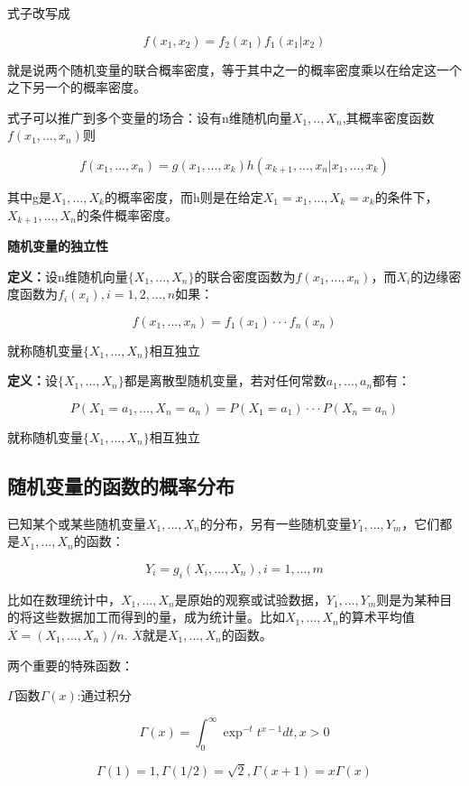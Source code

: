 \documentclass{ctexart}
\begin{document}
	式子改写成
	
	\[f(x_1, x_2)=f_2(x_1)f_1(x_1|x_2)\]
	
	就是说两个随机变量的联合概率密度，等于其中之一的概率密度乘以在给定这一个之下另一个的概率密度。
	
	式子可以推广到多个变量的场合：设有n维随机向量\(X_1,..,X_n\),其概率密度函数\(f(x_1,...,x_n)\)则
	
	\[f(x_1,...,x_n)=g(x_1,...,x_k)h(x_{k+1},...,x_n|x_1,...,x_k)\]
	
	其中g是\(X_1,...,X_k\)的概率密度，而h则是在给定\(X_1=x_1,...,X_k=x_k\)的条件下，\(X_{k+1},...,X_n\)的条件概率密度。
	
	\mbox{}
	
	\textbf{随机变量的独立性}
	
	\textbf{定义：}设n维随机向量\(\{X_1,...,X_n\}\)的联合密度函数为\(f(x_1,...,x_n)\)，而\(X_i\)的边缘密度函数为\(f_i(x_i),i=1,2,...,n\)如果：
	
	\[f(x_1,...,x_n)=f_1(x_1)···f_n(x_n)\]
	
	就称随机变量\(\{X_1,...,X_n\}\)相互独立
	
	\mbox{}
	
	\textbf{定义：}设\(\{X_1,...,X_n\}\)都是离散型随机变量，若对任何常数\(a_1,...,a_n\)都有：
	
	\[P(X_1=a_1,...,X_n=a_n)=P(X_1=a_1)···P(X_n=a_n)\]
	
	就称随机变量\(\{X_1,...,X_n\}\)相互独立
	
	\subsection{随机变量的函数的概率分布}
	
	已知某个或某些随机变量\(X_1,...,X_n\)的分布，另有一些随机变量\(Y_1,...,Y_m\)，它们都是\(X_1,...,X_n\)的函数：
	
	\[Y_i=g_i(X_i,...,X_n),i=1,...,m\]
	
	比如在数理统计中，\(X_1,...,X_n\)是原始的观察或试验数据，\(Y_1,...,Y_m\)则是为某种目的将这些数据加工而得到的量，成为统计量。比如\(X_1,...,X_n\)的算术平均值\(\overline{X}=(X_1,...,X_n)/n\). \(\overline{X}\)就是\(X_1,...,X_n\)的函数。
	
	两个重要的特殊函数：
	
	\(\Gamma\)函数\(\Gamma(x)\):通过积分
	
	\[\Gamma(x)=\int_{0}^{\infty}\exp^{-t}t^{x-1}dt, x > 0\]
	
	\[\Gamma(1)=1, \Gamma(1/2)=\sqrt{2}, \Gamma(x+1)=x\Gamma(x)\]
	
\end{document}
